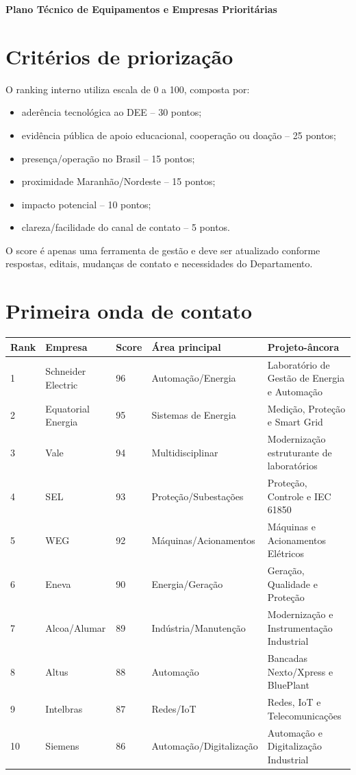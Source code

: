 \documentclass[11pt,a4paper]{article}
\begin{document}
\cabecalhoInstitucional
\begin{center}
{\Large\bfseries\color{azulpetroleo} Plano Técnico de Equipamentos e Empresas Prioritárias}
\end{center}

\section{Critérios de priorização}
O ranking interno utiliza escala de 0 a 100, composta por:
\begin{itemize}[leftmargin=*]
\item aderência tecnológica ao DEE -- 30 pontos;
\item evidência pública de apoio educacional, cooperação ou doação -- 25 pontos;
\item presença/operação no Brasil -- 15 pontos;
\item proximidade Maranhão/Nordeste -- 15 pontos;
\item impacto potencial -- 10 pontos;
\item clareza/facilidade do canal de contato -- 5 pontos.
\end{itemize}

O score é apenas uma ferramenta de gestão e deve ser atualizado conforme respostas, editais, mudanças de contato e necessidades do Departamento.

\section{Primeira onda de contato}
\begin{longtable}{p{} p{} p{} p{} p{}}
\toprule
\textbf{Rank} & \textbf{Empresa} & \textbf{Score} & \textbf{Área principal} & \textbf{Projeto-âncora}\\
\midrule
\endhead
1 & Schneider Electric & 96 & Automação/Energia & Laboratório de Gestão de Energia e Automação\\
2 & Equatorial Energia & 95 & Sistemas de Energia & Medição, Proteção e Smart Grid\\
3 & Vale & 94 & Multidisciplinar & Modernização estruturante de laboratórios\\
4 & SEL & 93 & Proteção/Subestações & Proteção, Controle e IEC 61850\\
5 & WEG & 92 & Máquinas/Acionamentos & Máquinas e Acionamentos Elétricos\\
6 & Eneva & 90 & Energia/Geração & Geração, Qualidade e Proteção\\
7 & Alcoa/Alumar & 89 & Indústria/Manutenção & Modernização e Instrumentação Industrial\\
8 & Altus & 88 & Automação & Bancadas Nexto/Xpress e BluePlant\\
9 & Intelbras & 87 & Redes/IoT & Redes, IoT e Telecomunicações\\
10 & Siemens & 86 & Automação/Digitalização & Automação e Digitalização Industrial\\
\bottomrule
\end{longtable}
\end{document}
